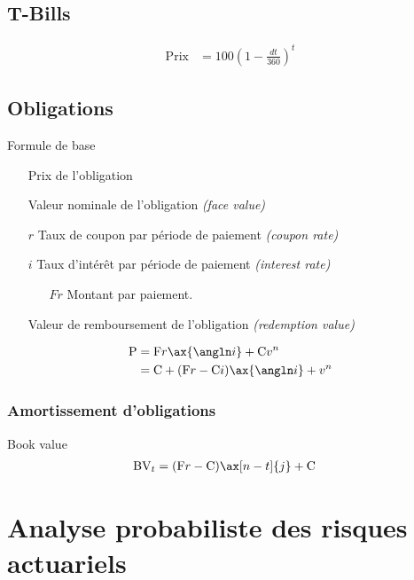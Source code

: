 \documentclass[10pt, french]{article}
\begin{document}
\begin{multicols*}{2}
\subsection*{T-Bills}

\begin{align*}
	\textrm{Prix}	
	&=	100 \left( 1 - \frac{dt}{360} \right)^{t}
\end{align*}

\subsection*{Obligations}

Formule de base

\begin{enumerate}
	\item[\text{P}] Prix de l'obligation 
	\item[\text{F}] Valeur nominale de l'obligation \textit{(face value)}
	\item[$r$] Taux de coupon par période de paiement \textit{(coupon rate)}
	\item[$i$] Taux d'intérêt par période de paiement \textit{(interest rate)}
	\begin{enumerate}
		\item[$Fr$] Montant par paiement.
	\end{enumerate}
	\item[\text{C}] Valeur de remboursement de l'obligation \textit{(redemption value)}
\end{enumerate}

\begin{align*}
	\text{P}
		&=	\text{F} r \ax{\angln i} + \text{C} v^{n} \\
		&=	\text{C} + (\text{F} r - \text{C} i) \ax{\angln i} +  v^{n} 
\end{align*}

\subsubsection*{Amortissement d'obligations}

Book value
\begin{align*}
	\text{BV}_{t}
		&=	(\text{F}r - \text{C}) \ax[n - t]{j} + \text{C}
\end{align*}

\section*{Analyse probabiliste des risques actuariels}


\end{multicols*}
\end{document}
